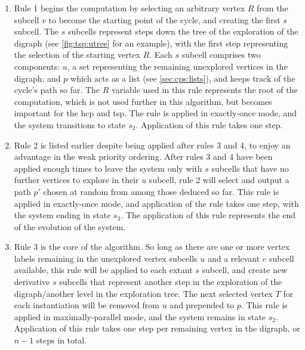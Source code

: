 \begin{enumerate}
    \item Rule 1 begins the computation by selecting an arbitrary vertex \(R\) from the subcell \(v\) to become the starting point of the cycle, and creating the first \(s\) subcell.  The \(s\) subcells represent steps down the tree of the exploration of the digraph (see \cref{fig:tsp:utree} for an example), with the first step representing the selection of the starting vertex \(R\).  Each \(s\) subcell comprises two components: \(u\), a set representing the remaining unexplored vertices in the digraph; and \(p\) which acts as a list (see \cref{sec:cps:lists}), and keeps track of the cycle's path so far.  The \(R\) variable used in this rule represents the root of the computation, which is not used further in this algorithm, but becomes important for the \gls{hcp} and \gls{tsp}.  The rule is applied in exactly-once mode, and the system transitions to state \(s_2\).  Application of this rule takes one step.
    \item Rule 2 is listed earlier despite being applied after rules 3 and 4, to enjoy an advantage in the weak priority ordering.  After rules 3 and 4 have been applied enough times to leave the system only with \(s\) subcells that have no further vertices to explore in their \(u\) subcell, rule 2 will select and output a path \(p'\) chosen at random from among those deduced so far.  This rule is applied in exactly-once mode, and application of the rule takes one step, with the system ending in state \(s_3\).  The application of this rule represents the end of the evolution of the system.
    \item Rule 3 is the core of the algorithm.  So long as there are one or more vertex labels remaining in the unexplored vertex subcells \(u\) and a relevant \(e\) subcell available, this rule will be applied to each extant \(s\) subcell, and create new derivative \(s\) subcells that represent another step in the exploration of the digraph/another level in the exploration tree.  The next selected vertex \(T\) for each instantiation will be removed from \(u\) and prepended to \(p\).  This rule is applied in maximally-parallel mode, and the system remains in state \(s_2\).  Application of this rule takes one step per remaining vertex in the digraph, or \(n - 1\) steps in total.

\end{enumerate}
